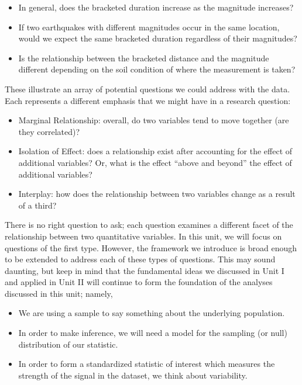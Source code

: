 \documentclass[]{book}
\providecommand{\tightlist}{%
  \setlength{\itemsep}{0pt}\setlength{\parskip}{0pt}}
\theoremstyle{plain}
\theoremstyle{mydefn}
\theoremstyle{myexmpl}
\theoremstyle{remark}
\begin{document}
\begin{itemize}
\tightlist
\item
  In general, does the bracketed duration increase as the magnitude
  increases?
\item
  If two earthquakes with different magnitudes occur in the same
  location, would we expect the same bracketed duration regardless of
  their magnitudes?
\item
  Is the relationship between the bracketed distance and the magnitude
  different depending on the soil condition of where the measurement is
  taken?
\end{itemize}

These illustrate an array of potential questions we could address with
the data. Each represents a different emphasis that we might have in a
research question:

\begin{itemize}
\tightlist
\item
  Marginal Relationship: overall, do two variables tend to move together
  (are they correlated)?
\item
  Isolation of Effect: does a relationship exist after accounting for
  the effect of additional variables? Or, what is the effect ``above and
  beyond'' the effect of additional variables?
\item
  Interplay: how does the relationship between two variables change as a
  result of a third?
\end{itemize}

There is no right question to ask; each question examines a different
facet of the relationship between two quantitative variables. In this
unit, we will focus on questions of the first type. However, the
framework we introduce is broad enough to be extended to address each of
these types of questions. This may sound daunting, but keep in mind that
the fundamental ideas we discussed in Unit I and applied in Unit II will
continue to form the foundation of the analyses discussed in this unit;
namely,

\begin{itemize}
\tightlist
\item
  We are using a sample to say something about the underlying
  population.
\item
  In order to make inference, we will need a model for the sampling (or
  null) distribution of our statistic.
\item
  In order to form a standardized statistic of interest which measures
  the strength of the signal in the dataset, we think about variability.
\end{itemize}
\end{document}
